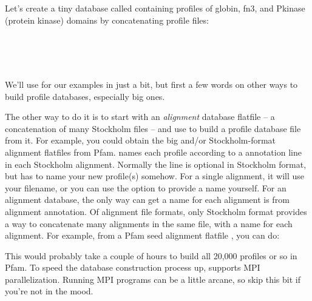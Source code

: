 Let's create a tiny database called  containing profiles
of globin, fn3, and Pkinase (protein kinase) domains by concatenating
profile files:

   \vspace{1ex}
   \\
   \\
   \\
   \vspace{1ex}

We'll use  for our examples in just a bit, but first a
few words on other ways to build profile databases, especially big ones.

The other way to do it is to start with an \emph{alignment} database
flatfile -- a concatenation of many Stockholm files -- and use
 to build a profile database file from it.  For
example, you could obtain the big  and/or
 Stockholm-format alignment flatfiles from Pfam.
 names each profile according to a 
annotation line in each Stockholm alignment. Normally the 
line is optional in Stockholm format, but  has to name
your new profile(s) somehow. For a single alignment, it will use your
filename, or you can use the  option to
provide a name yourself. For an alignment database, the only way
 can get a name for each alignment is from alignment
annotation.  Of alignment file formats, only Stockholm format provides a
way to concatenate many alignments in the same file, with a name for
each alignment. For example, from a Pfam seed alignment flatfile
, you can do:

   \vspace{1ex}
   \vspace{1ex}

This would probably take a couple of hours to build all 20,000 profiles
or so in Pfam. To speed the database construction process up,
 supports MPI parallelization. Running MPI programs can
be a little arcane, so skip this bit if you're not in the mood.

